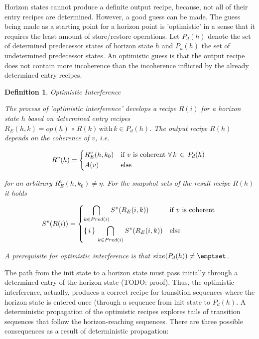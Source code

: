 \documentclass[12pt,a4paper]{scrartcl}
\newtheorem{definition}{Definition}
\begin{document}
Horizon states cannot produce a definite output recipe, because, not all of
their entry recipes are determined. However, a good guess can be made.  The
guess being made as a starting point for a horizon point is 'optimistic' in a sense
that it requires the least amount of store/restore operations. Let $P_d(h)$
denote the set of determined predecessor states of horizon state $h$ and
$P_u(h)$ the set of undetermined predecessor states. An optimistic guess is
that the output recipe does not contain more incoherence than the incoherence
inflicted by the already determined entry recipes.

\begin{definition} Optimistic Interference

    The process of 'optimistic interference' develops a recipe $R(i)$ for a
    horizon state $h$ based on determined entry recipes $R_E(h,k) =
    op(h)\,\circ\,R(k)\,\mbox{with}\,k \in P_d(h)$.  The output recipe $R(h)$
    depends on the coherence of $v$, i.e. 

    \begin{equation} \label{eq:opt-interference-output}
        R^v(h) = 
        \begin{dcases*}
            R_E^v(h,k_0) & if $v$ is coherent $\forall\,k\,\in\,P_d(h)$ \\
            A(v)         & else
        \end{dcases*}
    \end{equation}

    for an arbitrary $R_E^v(h,k_0)\neq\eta$. For the snapshot sets of the
    result recipe $R(h)$ it holds

    \begin{equation} \label{eq:interference-snapshot-sets}
        S^v(R(i)) = 
        \begin{dcases*}
            \bigcap_{k\in Pred(i)} S^v(R_E(i,k))            & if $v$ is coherent \\
            \{\,i\,\}\,\bigcap_{k\in Pred(i)} S^v(R_E(i,k)) & else \\
        \end{dcases*}
    \end{equation}

    A prerequisite for optimistic interference is that 
    $size(P_d(h)) \neq \emptset$.

\end{definition}

The path from the init state to a horizon state must pass initially through a
determined entry of the horizon state (TODO: proof). Thus, the optimistic
interference, actually, produces a correct recipe for transition sequences
where the horizon state is entered once (through a sequence from init state to
$P_d(h)$. A deterministic propagation of the optimistic recipes explores tails
of transition sequences that follow the horizon-reaching sequences. There are
three possible consequences as a result of deterministic propagation:
\end{document}

